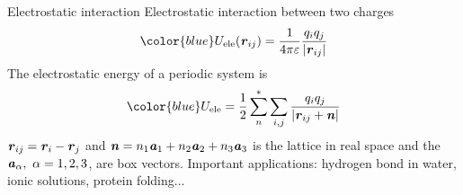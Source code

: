 \documentclass{beamer}
\newcommand{\redc}[1]{{\color{red} #1}}
\newcommand{\bluec}[1]{{\color{blue} #1}}
\renewcommand{\v}[1]{\textbf{\textit{#1}}}
\begin{document}



 

\begin{frame} {Electrostatic interaction}
  \vfill Electrostatic interaction between two charges
  $$\bluec{
    U_{\textrm{ele}}(\v r_{ij}) = \frac1{4\pi\varepsilon}\frac{q_i q_j}{\vert \v r_{ij}\vert}}
  $$
  \vfill
  The electrostatic energy of a periodic system is \vfill
  \begin{equation*}\bluec{
    U_{\textrm{ele}} = \frac12 \sum^\ast_{n}\sum_{i,j}\frac{q_i q_j}{\vert \v r_{ij} + \v n\vert}}
  \end{equation*}\vfill
  $\v r_{ij} = \v r_i - \v r_j$ and $\v n = n_1 \v a_1 + n_2 \v a_2 +
  n_3 \v a_3$ is the lattice in real space and the $\v a_\alpha, \
  \alpha=1,2,3$, are box vectors. \vfill
  Important applications: \redc{hydrogen bond in water}, \redc{ionic solutions},
  \redc{protein folding}...  \vfill
\end{frame}
\end{document}
